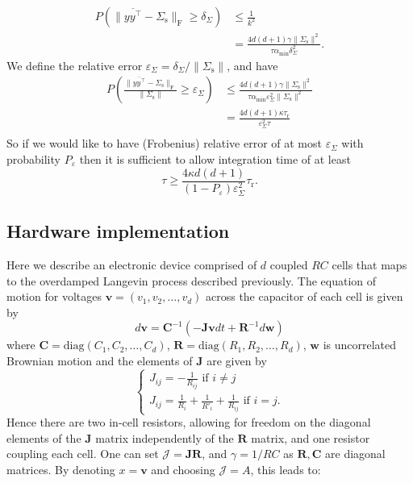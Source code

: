 \documentclass[prx,onecolumn,floatfix,longbibliography,notitlepage, nofootinbib]{revtex4-1}
\renewcommand{\geq}{\geqslant}
\renewcommand{\leq}{\leqslant}
\begin{document}
\begin{appendix}
\begin{align}
    P\left( \|\overline{y y^\intercal} - \Sigma_\text{s}\|_\text{F} \geq \delta_\Sigma \right)
    &\leq \frac{1}{k^2}\\
    & = \frac{4 d (d+1) \gamma \|\Sigma_\text{s}\|^2}{\tau \alpha_\text{min} \delta_\Sigma^2}.
\end{align}
We define the relative error $\varepsilon_\Sigma = \delta_\Sigma/\|\Sigma_\text{s}\|$, and have 
\begin{align}
    P\left( \frac{\|\overline{y y^\intercal} - \Sigma_\text{s}\|_\text{F}}{\|\Sigma_\text{s}\|} \geq \varepsilon_\Sigma \right)
    & \leq \frac{4 d (d+1) \gamma \|\Sigma_\text{s}\|^2}{\tau \alpha_\text{min} \varepsilon_\Sigma^2 \|\Sigma_\text{s}\|^2}\\
    & =  \frac{4 d (d+1) \kappa \tau_\text{r}}{  \varepsilon_\Sigma^2 \tau }\\
\end{align}
So if we would like to have  (Frobenius) relative error of at most $\varepsilon_\Sigma$ with probability $P_\varepsilon$ then it is sufficient to allow integration time of at least
\begin{equation}
    \tau \geq \frac{4 \kappa d(d+1)}{(1-P_\varepsilon)\varepsilon_\Sigma^2}\tau_\text{r}.
\end{equation}


\subsection{Hardware implementation}\label{app:hw}
Here we describe an electronic device comprised of $d$ coupled $RC$ cells that maps to the overdamped Langevin process described previously. The equation of motion for voltages $\mathbf{v} = (v_1, v_2, \ldots, v_d)$ across the capacitor of each cell is given by
\begin{equation}d\mathbf{v} = \mathbf{C}^{-1}(-\mathbf{J}\mathbf{v}dt+\mathbf{R}^{-1}d\mathbf{w})\end{equation}
where $\mathbf{C} = \mathrm{diag}(C_1, C_2, \ldots, C_d)$, $\mathbf{R} = \mathrm{diag}(R_1, R_2, \ldots, R_d)$, $\mathbf{w}$ is uncorrelated Brownian motion and the elements of $\mathbf{J}$ are given by
\begin{equation}
    \begin{cases}
    J_{ij} = -\frac{1}{R_{ij}} \text{ if } i\neq j \\
    J_{ij} = \frac{1}{R_{i}} + \frac{1}{R'_{i}} + \frac{1}{R_{ij}} \text{ if } i= j.
\end{cases}
\end{equation}
Hence there are two in-cell resistors, allowing for freedom on the diagonal elements of the $\mathbf{J}$ matrix independently of the $\mathbf{R}$ matrix, and one resistor coupling each cell. One can set $\mathcal{J} = \mathbf{J} \mathbf{R}$, and $\gamma = 1/RC$ as $\mathbf{R},\mathbf{C}$ are diagonal matrices. By denoting $x = \mathbf{v}$ and choosing $\mathcal{J} = A$, this leads to:


\end{appendix}
\end{document}
